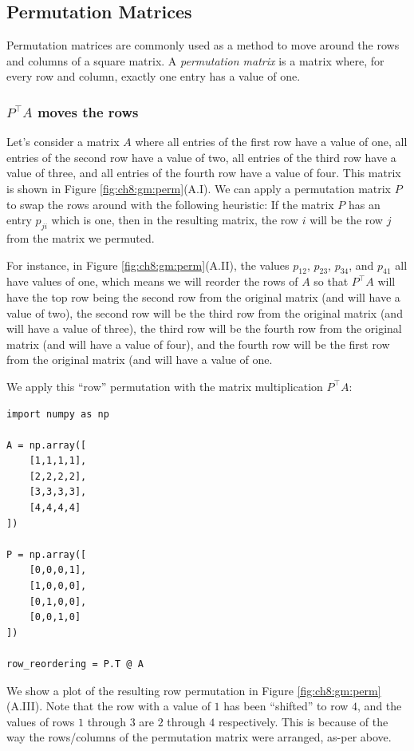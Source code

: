 \subsection{Permutation Matrices}

Permutation matrices are commonly used as a method to move around the rows and columns of a square matrix. A \textit{permutation matrix} is a matrix where, for every row and column, exactly one entry has a value of one. 
\subsubsection*{$P^\top A$ moves the rows}

Let's consider a matrix $A$ where all entries of the first row have a value of one, all entries of the second row have a value of two, all entries of the third row have a value of three, and all entries of the fourth row have a value of four. This matrix is shown in Figure \ref{fig:ch8:gm:perm}(A.I). We can apply a permutation matrix $P$ to swap the rows around with the following heuristic: If the matrix $P$ has an entry $p_{ji}$ which is one, then in the resulting matrix, the row $i$ will be the row $j$ from the matrix we permuted. 

For instance, in Figure \ref{fig:ch8:gm:perm}(A.II), the values $p_{12}$, $p_{23}$, $p_{34}$, and $p_{41}$ all have values of one, which means we will reorder the rows of $A$ so that $P^\top A$ will have the top row being the second row from the original matrix (and will have a value of two), the second row will be the third row from the original matrix (and will have a value of three), the third row will be the fourth row from the original matrix (and will have a value of four), and the fourth row will be the first row from the original matrix (and will have a value of one. 

We apply this ``row'' permutation with the matrix multiplication $P^\top A$:

\begin{lstlisting}[style=python]
import numpy as np

A = np.array([
    [1,1,1,1],
    [2,2,2,2],
    [3,3,3,3],
    [4,4,4,4]
])

P = np.array([
    [0,0,0,1],
    [1,0,0,0],
    [0,1,0,0],
    [0,0,1,0]
])

row_reordering = P.T @ A
\end{lstlisting}

We show a plot of the resulting row permutation in Figure \ref{fig:ch8:gm:perm}(A.III). Note that the row with a value of $1$ has been ``shifted'' to row $4$, and the values of rows $1$ through $3$ are $2$ through $4$ respectively. This is because of the way the rows/columns of the permutation matrix were arranged, as-per above.

